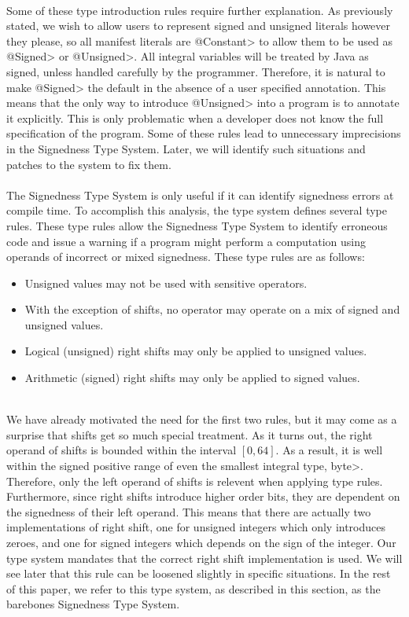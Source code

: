 \noindent\\
Some of these type introduction rules require further explanation. As
previously stated, we wish to allow users to represent signed and unsigned
literals however they please, so all manifest literals are
\<@Constant> to allow them to be used as \<@Signed> or \<@Unsigned>. All
integral variables will be treated by Java as signed, unless handled
carefully by the programmer. Therefore, it is natural to make \<@Signed> the
default in the absence of a user specified annotation. This means that
the only way to introduce \<@Unsigned> into a program is to annotate it
explicitly. This is only problematic when a developer does not know the
full specification of the program. Some of these rules lead to unnecessary
imprecisions in the Signedness Type System. Later, we will identify such
situations and patches to the system to fix them.\\
\\
The Signedness Type System is only useful if it can identify signedness errors
at compile time. To accomplish this analysis, the type system defines several
type rules. These type rules allow the Signedness Type System to identify
erroneous code and issue a warning if a program
might perform a computation using operands of incorrect or mixed signedness.
These type rules are as follows:

\begin{itemize}
  \item Unsigned values may not be used with sensitive
    operators.
  \item With the exception of shifts, no operator may operate on a mix of
    signed and unsigned values.
  \item Logical (unsigned) right shifts may only be applied to unsigned values.
  \item Arithmetic (signed) right shifts may only be applied to signed values.
\end{itemize}

\noindent\\
We have already motivated the need for the first two rules, but it may come
as a surprise that shifts get so much special treatment. As it turns out,
the right operand of shifts is bounded within the interval $[0, 64]$. As a
result, it is well within the signed positive range of even the smallest
integral type, \<byte>. Therefore, only the left operand of shifts is relevent
when applying type rules. Furthermore, since right shifts introduce
higher order bits, they are dependent on the signedness of their left operand.
This means that there are actually two implementations of right shift, one for
unsigned integers which only introduces zeroes, and one for signed integers
which depends on the sign of the integer. Our type system mandates that
the correct right shift implementation is used. We will see later that this
rule can be loosened slightly in specific situations. In the rest of this paper,
we refer to this type system, as described in this section, as the barebones
Signedness Type System.

